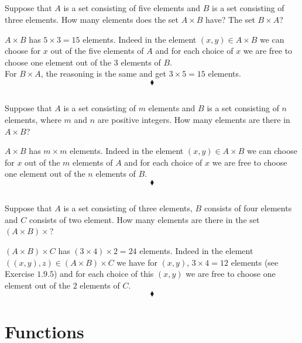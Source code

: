 \subsection{}
\begin{tcolorbox}
Suppose that $A$ is a set consisting of five elements and $B$ is a set consisting of three elements. How many elements does the set $A\times B$ have? The set $B\times A$?
\end{tcolorbox}
$A\times B$ has $5\times 3 =15$ elements. Indeed in the element $(x,y) \in A\times B$  we can choose for $x$ out of the five elements of $A$ and for each choice of $x$ we are free to choose one element out of the $3$ elements of $B$.\\
For $B\times A$, the reasoning is the same and get $3\times 5=15$ elements.
$$\blacklozenge$$

\subsection{}
\begin{tcolorbox}
Suppose that $A$ is a set consisting of $m$ elements and $B$ is a set consisting of $n$ elements, where $m$ and $n$ are positive integers. How many elements are there in  $A\times B$?
\end{tcolorbox}
$A\times B$ has $m\times m $ elements. Indeed in the element $(x,y) \in A\times B$  we can choose for $x$ out of the $m$ elements of $A$ and for each choice of $x$ we are free to choose one element out of the $n$ elements of $B$.
$$\blacklozenge$$

\subsection{}
\begin{tcolorbox}
Suppose that $A$ is a set consisting of three elements, $B$ consists of four elements and $C$ consists of two element. How many elements are there in the set   $(A\times B)\times$?
\end{tcolorbox}
$(A\times B)\times C$ has $(3\times 4)\times 2 = 24 $ elements. Indeed in the element $\left((x,y), z\right) \in (A\times B)\times C $  we have  for $(x,y)$,  $3\times 4 =12$ elements (see Exercise $1.9.5$) and for each choice of this $(x,y)$ we are free to choose one element out of the $2$ elements of $C$.
$$\blacklozenge$$\newpage

 \section{Functions}
